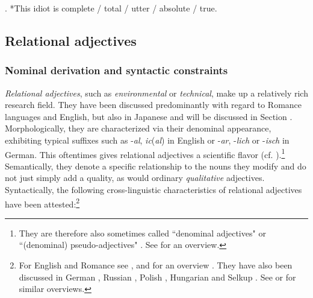 \ex. *This idiot is complete / total / utter / absolute / true.

\subsection{Relational adjectives} \label{RA}

\subsubsection{Nominal derivation and syntactic constraints}

\textit{Relational adjectives}, such as \textit{environmental} or \textit{technical}, make up a relatively rich research field. They have been discussed predominantly with regard to Romance languages and English, but also in Japanese \citep{bisetto:2010:RA, nagano:2015:RA, nagano:2016:are, nagano:2018:conversion, shimada:2018:relational, morita:2010:internal, morita:2011:three, morita:2013:morph} and will be discussed in Section . Morphologically, they are characterized via their denominal appearance, exhibiting typical suffixes such as -\textit{al}, \textit{ic}(\textit{al}) in English or -\textit{ar}, -\textit{lich} or -\textit{isch} in German. This oftentimes gives relational adjectives a scientific flavor (cf. \citealt{gunkel:2008:constraints}).\footnote{They are therefore also sometimes called ``denominal adjectives" or ``(denominal) pseudo-adjectives" \citep{postal:1969:anaphoric, bartning:1980:remarques}. See \citet[52–56]{bortolotto:2016:RA} for an overview.} Semantically, they denote a specific relationship to the nouns they modify and do not just simply add a quality, as would ordinary \textit{qualitative} adjectives. Syntactically, the following cross-linguistic characteristics of relational adjectives have been attested:\footnote{For English and Romance see \citet{postal:1969:anaphoric, downing:1977:creation, levi:1978:syntax, bartning:1980:remarques, bartning:1984:aspects, bartning:1986:paralelisme, warren:1984:classifying, bosque:1993:sobre, bosque:1996:postnominal, mcnally:2004:relational, fabregas:2007:internal, fabregas:2014:adjectival, gunkel:2008:constraints, roy:2010:deadjectival, zifonun:2011:RA, rainer:2013:can, bortolotto:2016:RA}, and for an overview \citet[§ 3.3 and 9.2]{alex:2007:nounphrase}. They have also been discussed in German \citep{hotzen:1967:gegenwart, schaublin:1972:probleme, eichinger:1979:syntaktische, frevel:2005:RA, trost:2006:das}, Russian \citep{mezhevich:2002:english}, Polish \citep{cetnarowska:2015:categorial}, Hungarian \citep{kenesei:2014:on} and Selkup \citep{spencer:2017:denominal, nikolaeva:2020:mixed}. See \citet[44]{nagano:2016:are} or \citet[§ 2.3]{bortolotto:2016:RA} for similar overviews.}       

